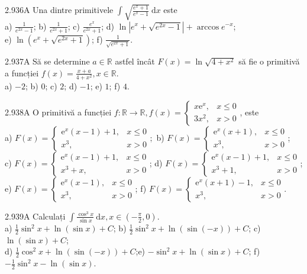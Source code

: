 \documentclass[11pt]{article}
\begin{document}
2.936A Una dintre primitivele $\int \sqrt{\frac{e^{x}+1}{e^{x}-1}} \mathrm{~d} x$ este\\ a) $\frac{1}{e^{2 x}-1}$; b) $\frac{1}{e^{2 x}+1}$; c) $\frac{e^{x}}{e^{2 x}+1}$; d) $\ln \left|e^{x}+\sqrt{e^{2 x}-1}\right|+\arccos e^{-x}$;\\ e) $\ln \left(e^{x}+\sqrt{e^{2 x}+1}\right)$; f) $\frac{1}{\sqrt{e^{2 x}+1}}$.

2.937A Să se determine $a \in \mathbb{R}$ astfel încât $F(x)=\ln \sqrt{4+x^{2}}$ să fie o primitivă a funcției $f(x)=\frac{x+a}{4+x^{2}}, x \in \mathbb{R}$.\\ a) $-2$; b) $0$; c) $2$; d) $-1$; e) $1$; f) $4$.

2.938A O primitivă a funcției $f: \mathbb{R} \rightarrow \mathbb{R}, f(x)=\left\{\begin{array}{ll}x \mathrm{e}^{x}, & x \leq 0 \\ 3 x^{2}, & x>0\end{array}\right.$, este\\ a) $F(x)=\left\{\begin{array}{ll}\mathrm{e}^{x}(x-1)+1, & x \leq 0 \\ x^{3}, & x>0\end{array} ;\right.$ b) $F(x)= \begin{cases}\mathrm{e}^{x}(x+1), & x \leq 0 \\ x^{3}, & x>0\end{cases}$;\\ c) $F(x)=\left\{\begin{array}{ll}\mathrm{e}^{x}(x-1)+1, & x \leq 0 \\ x^{3}+x, & x>0\end{array}\right.$; d) $F(x)= \begin{cases}\mathrm{e}^{x}(x-1)+1, & x \leq 0 \\ x^{3}+1, & x>0\end{cases}$;\\ e) $F(x)=\left\{\begin{array}{ll}\mathrm{e}^{x}(x-1), & x \leq 0 \\ x^{3}, & x>0\end{array}\right.$; f) $F(x)= \begin{cases}\mathrm{e}^{x}(x+1)-1, & x \leq 0 \\ x^{3}, & x>0\end{cases}$.

2.939A Calculați $\int \frac{\cos ^{3} x}{\sin x} \mathrm{~d} x, x \in\left(-\frac{\pi}{2}, 0\right)$.\\ a) $\frac{1}{2} \sin ^{2} x+\ln (\sin x)+C$; b) $\frac{1}{2} \sin ^{2} x+\ln (\sin (-x))+C$; c) $\ln (\sin x)+C$;\\ d) $\frac{1}{2} \cos ^{2} x+\ln (\sin (-x))+C$;e) $-\sin ^{2} x+\ln (\sin x)+C$; f) $-\frac{1}{2} \sin ^{2} x-\ln (\sin x)$.
\end{document}
